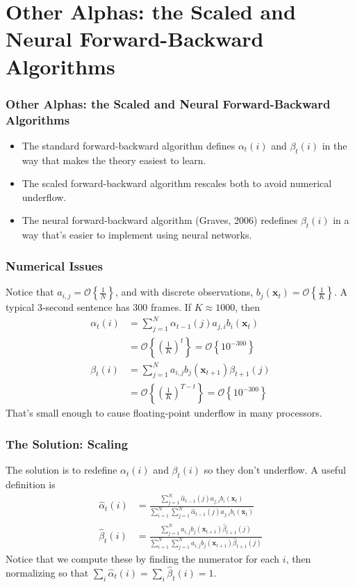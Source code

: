 \documentclass{beamer}
\begin{document}
\section[Other Alphas]{Other Alphas: the Scaled and Neural Forward-Backward Algorithms}
\setcounter{subsection}{1}

\begin{frame}
  \frametitle{Other Alphas: the Scaled and Neural Forward-Backward Algorithms}

  \begin{itemize}
  \item The standard forward-backward algorithm defines $\alpha_t(i)$
    and $\beta_t(i)$ in the way that makes the theory easiest to learn.
  \item The scaled forward-backward algorithm rescales both to avoid
    numerical underflow.
  \item The neural forward-backward algorithm (Graves, 2006) redefines
    $\beta_t(i)$ in a way that's easier to implement using neural
    networks.
  \end{itemize}
\end{frame}

\begin{frame}
  \frametitle{Numerical Issues}

  Notice that $a_{i,j}=\mathcal{O}\left\{\frac{1}{N}\right\}$, and
  with discrete observations,
  $b_j(\mathbf{x}_t)=\mathcal{O}\left\{\frac{1}{K}\right\}$.  A
  typical 3-second sentence has 300 frames.  If $K\approx 1000$, then
  \begin{align*}
    \alpha_{t}(i) &= \sum_{j=1}^N \alpha_{t-1}(j) a_{j,i}b_i(\mathbf{x}_t)\\
    &= \mathcal{O}\left\{\left(\frac{1}{K}\right)^t\right\}
    = \mathcal{O}\left\{10^{-300}\right\}\\
    \beta_t(i) &= \sum_{j=1}^N a_{i,j}b_j(\mathbf{x}_{t+1})\beta_{t+1}(j)\\
    &= \mathcal{O}\left\{\left(\frac{1}{K}\right)^{T-t}\right\}= \mathcal{O}\left\{10^{-300}\right\}
  \end{align*}
  That's small enough to cause floating-point underflow in many
  processors.
\end{frame}


\begin{frame}
  \frametitle{The Solution: Scaling}

  The solution is to redefine $\alpha_t(i)$ and $\beta_t(i)$ so they
  don't underflow.  A useful definition is
  \begin{align*}
    \hat\alpha_{t}(i) &= \frac{\sum_{j=1}^N \hat\alpha_{t-1}(j) a_{j,i}b_i(\mathbf{x}_t)}{\sum_{i=1}^N\sum_{j=1}^N \hat\alpha_{t-1}(j) a_{j,i}b_i(\mathbf{x}_t)}\\
    \hat\beta_t(i) &= \frac{\sum_{j=1}^N a_{i,j}b_j(\mathbf{x}_{t+1})\hat\beta_{t+1}(j)}{\sum_{i=1}^N\sum_{j=1}^N a_{i,j}b_j(\mathbf{x}_{t+1})\hat\beta_{t+1}(j)}
  \end{align*}
  Notice that we compute these by finding the numerator for each $i$,
  then normalizing so that $\sum_i\hat\alpha_t(i)=\sum_i\hat\beta_t(i)=1$.
\end{frame}
\end{document}
